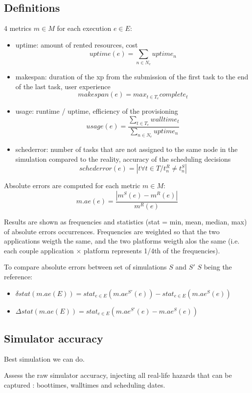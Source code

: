 \subsection{Definitions}
4 metrics $m \in M$ for each execution $e \in E$:
\begin{itemize}
 \item uptime: amount of rented resources, cost 
  $$uptime(e) = \sum_{n \in N_e} uptime_n$$
 \item makespan: duration of the xp from the submission of the first task to 
the end of the last task, user experience 
  $$makespan(e) = max_{t \in T_e} complete_t$$
 \item usage: runtime / uptime, efficiency of the provisioning 
  $$usage(e) = \frac{\sum_{t \in T_e} walltime_t}{\sum_{n \in N_e} uptime_n}$$
 \item schederror: number of tasks that are not assigned to the same node in 
the simulation compared to the reality, accuracy of the scheduling decisions
  $$schederror(e) = |t \forall t \in T / t_n^R \neq t_n^S|$$

\end{itemize}

Absolute errors are computed for each metric $m \in M$: 
$$m.ae(e) = \frac{| m^S(e) - m^R(e) |}{m^R(e)}$$

Results are shown as frequencies and statistics (stat = min, mean, median, max) 
of absolute errors occurrences. Frequencies are weighted so that the two applications
weigth the same, and the two platforms weigth alos the same 
(i.e. each couple application $\times$ platform represents 1/4th of the frequencies).

To compare absolute errors between set of simulations $S$ and $S'$
$S$ being the reference:
\begin{itemize}
 \item $\delta stat(m.ae(E)) = stat_{e \in E} ( m.ae^{S'}(e) ) - stat_{e \in E}( m.ae^S(e) )$
 \item $\Delta stat(m.ae(E)) = stat_{e \in E} ( m.ae^{S'}(e) - m.ae^S(e) )$
\end{itemize}




\subsection{Simulator accuracy}

Best simulation we can do.

Assess the raw simulator accuracy, injecting all real-life hazards that can be 
captured :
boottimes, walltimes and scheduling dates.

